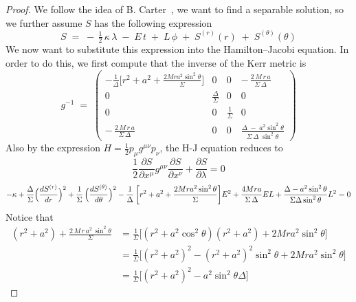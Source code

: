 \documentclass{article}
\theoremstyle{remark}
\begin{document}
\begin{proof}
We follow the idea of B. Carter~\cite{carter}, we want to find a separable solution, so we further assume $S$ has the following expression
    \begin{equation}
        S \;=\; -\,\tfrac12\,\kappa\,\lambda
        \;-\; E\,t
        \;+\; L\,\phi
        \;+\; S^{(r)}(r)
        \;+\; S^{(\theta)}(\theta)
    \end{equation}
We now want to substitute this expression into the Hamilton--Jacobi equation. In order to do this, we first compute that the inverse of the Kerr metric is 
\begin{equation}
    g^{-1}
\;=\;
\begin{pmatrix}
-\frac{1}{\Delta} \bigl[r^2 + a^2+\frac{2Mra^2\sin^2\theta}{\Sigma}\bigr] & 0 & 0 & -\,\frac{2\,M\,r\,a}{\Sigma\,\Delta}\\[6pt]
0 & \displaystyle \frac{\Delta}{\Sigma} & 0 & 0\\[6pt]
0 & 0 & \displaystyle \frac{1}{\Sigma} & 0\\[6pt]
-\,\frac{2\,M\,r\,a}{\Sigma\,\Delta} & 0 & 0 & \frac{\Delta \;-\; a^2\sin^2\theta}{\Sigma\,\Delta\;\sin^2\theta}
\end{pmatrix}
\end{equation}
Also by the expression $H=\frac{1}{2}p_{\mu}g^{\mu\nu}p_{\nu}$, the H-J equation reduces to 
\begin{equation}
    \frac{1}{2}\frac{\partial S}{\partial x^{\mu}}g^{\mu\nu}\frac{\partial S}{\partial x^{\nu}}+\frac{\partial S}{\partial \lambda}=0
\end{equation}
\begin{equation}
    -\kappa
+
\frac{\Delta}{\Sigma}\Bigl(\frac{dS^{(r)}}{dr}\Bigr)^{2}
+
\frac{1}{\Sigma}\,\Bigl(\frac{dS^{(\theta)}}{d\theta}\Bigr)^{2}
-
\frac{1}{\Delta}\,\biggl[
  r^{2} + a^{2}
  +
  \frac{2Mra^{2}\sin^{2}\theta}{\Sigma}
\biggr]E^{2}
+
\frac{4Mra}{\Sigma\,\Delta}EL
+
\frac{\Delta - a^{2}\sin^{2}\theta}{\Sigma\Delta\sin^{2}\theta}L^{2}
=0
\end{equation}
Notice that
\begin{align}
(r^2 + a^2)+\frac{2\,M\,r\,a^2\,\sin^2\theta}{\Sigma}
&=\frac{1}{\Sigma}
\bigl[
  (r^2 + a^2\cos^2\theta)(r^2 + a^2)+2Mra^2\sin^2\theta
\bigr]
\\
&=
\frac{1}{\Sigma}
\bigl[
  (r^2 + a^2)^2-(r^2 + a^2)^2\sin^2\theta+
  2Mra^2\sin^2\theta
\bigr]
\\
&=
\frac{1}{\Sigma}
\bigl[
  (r^2 + a^2)^2-a^2\sin^2\theta\Delta
\bigr]
\end{align}

\end{proof}
\end{document}
